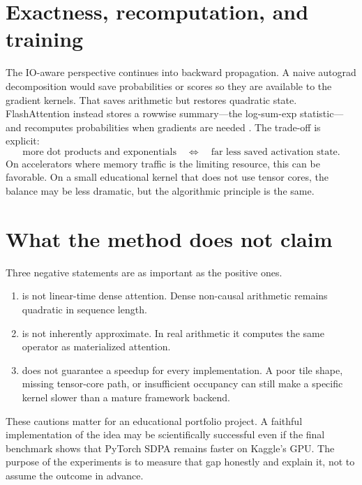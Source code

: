 \section{Exactness, recomputation, and training}

The IO-aware perspective continues into backward propagation. A naive autograd decomposition would save probabilities or scores so they are available to the gradient kernels. That saves arithmetic but restores quadratic state. FlashAttention instead stores a rowwise summary---the log-sum-exp statistic---and recomputes probabilities when gradients are needed \citep{dao2022flashattention}. The trade-off is explicit:
\begin{equation}
  \text{more dot products and exponentials}
  \quad \Longleftrightarrow \quad
  \text{far less saved activation state}.
\end{equation}
On accelerators where memory traffic is the limiting resource, this can be favorable. On a small educational kernel that does not use tensor cores, the balance may be less dramatic, but the algorithmic principle is the same.

\section{What the method does not claim}

Three negative statements are as important as the positive ones.

\begin{enumerate}
  \item \FA{} is not linear-time dense attention. Dense non-causal arithmetic remains quadratic in sequence length.
  \item \FA{} is not inherently approximate. In real arithmetic it computes the same operator as materialized attention.
  \item \FA{} does not guarantee a speedup for every implementation. A poor tile shape, missing tensor-core path, or insufficient occupancy can still make a specific kernel slower than a mature framework backend.
\end{enumerate}

These cautions matter for an educational portfolio project. A faithful implementation of the idea may be scientifically successful even if the final benchmark shows that PyTorch SDPA remains faster on Kaggle's GPU. The purpose of the experiments is to measure that gap honestly and explain it, not to assume the outcome in advance.
